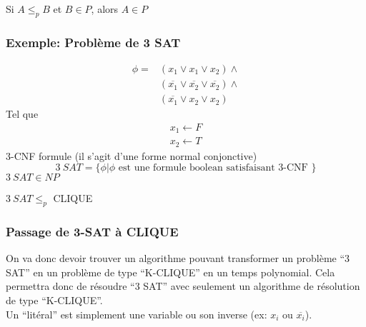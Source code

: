 \documentclass[a4paper,12pt]{article}
\begin{document}
    \begin{importantBox}
      Si $A \leq_p B$ et $B \in P$, alors $A \in P$
    \end{importantBox}
    
    \subsubsection{Exemple: Problème de 3 SAT}
      \begin{align*}
	\phi = &(x_1 \vee x_1 \vee x_2) \wedge \\
	&(\overline{x_1} \vee \overline{x_2} \vee \overline{x_2}) \wedge \\
	&(\overline{x_1} \vee x_2 \vee x_2)
      \end{align*}
      Tel que
      \begin{align*}
	x_1 \leftarrow F\\
	x_2 \leftarrow T
      \end{align*}
      3-CNF formule (il s'agit d'une forme normal conjonctive)
      $$3\ SAT = \big\{\phi | \phi \text{ est une formule boolean satisfaisant 3-CNF } \big\}$$
      $3\ SAT \in NP$
    
      \begin{theoremeBox}
	$3\ SAT \leq_p$ CLIQUE
      \end{theoremeBox}
    
    \subsubsection{Passage de 3-SAT à CLIQUE}
      On va donc devoir trouver un algorithme pouvant transformer un problème ``3 SAT'' en un problème de type ``K-CLIQUE'' en un temps polynomial.  Cela permettra donc de résoudre ``3 SAT'' avec seulement un algorithme de résolution de type ``K-CLIQUE''.\\
      Un ``litéral'' est simplement une variable ou son inverse (ex: $x_i$ ou $\overline{x_i}$).
      
\end{document}
